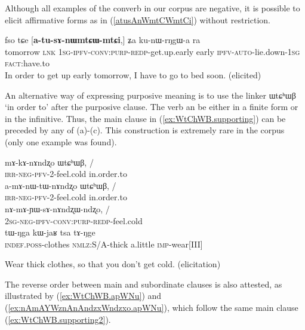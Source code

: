 \documentclass[oldfontcommands,oneside,a4paper,11pt]{article}
\newcommand{\ipa}[1]{{\phon \mbox{#1}}} %
\newcommand{\refb}[1]{(\ref{#1})}
\begin{document}
Although all examples of the converb in our corpus are negative, it is possible to elicit affirmative forms  as in \refb{atusAnWmtCWmtCi} without restriction.

\begin{exe}
\ex \label{atusAnWmtCWmtCi}
\gll
 \ipa{fso}   	\ipa{tɕe}   	[\ipa{\textbf{a-tu-sɤ-nɯmtɕɯ-mtɕi},}]   	\ipa{ʑa}   	\ipa{ku-nɯ-rŋgɯ-a}   	\ipa{ra}  \\
tomorrow \textsc{lnk} \textsc{1sg-ipfv-conv:purp-redp}-get.up.early early \textsc{ipfv-auto}-lie.down-\textsc{1sg} \textsc{fact}:have.to 
\\
\glt In order to get up early tomorrow, I have to go to bed soon. (elicited) 
\end{exe}

 An alternative way of expressing purposive meaning is to use the linker \ipa{ɯtɕʰɯβ} `in order to'  after the purposive clause. The verb  an be either in a finite form or in the infinitive.  Thus, the main clause in \refb{ex:WtChWB.supporting}  can be preceded by any of  (a)-(c).  This construction is extremely rare in the corpus (only one example was found).
 
 \begin{exe}
\ex \label{ex:WtChWB}  \begin{xlist}
\ex
 \gll 
\ipa{mɤ-kɤ-nɤndʐo} 	\ipa{ɯtɕʰɯβ,} 	/\\
 \textsc{irr-neg-pfv}-2-feel.cold in.order.to\\
 \ex
 \gll 
\ipa{a-mɤ-nɯ-tɯ-nɤndʐo} 	\ipa{ɯtɕʰɯβ,} / \\
 \textsc{irr-neg-pfv}-2-feel.cold in.order.to\\
 \ex \label{ex:nAmAsAnAndzxWndzxo}  
 \gll 
 \ipa{nɤ-mɤ-ɲɯ-sɤ-nɤndʐɯ-ndʐo,} /\\
 \textsc{2sg-neg-ipfv-conv:purp-redp}-feel.cold\\
 \ex  \label{ex:WtChWB.supporting}  
 \gll 
 \ipa{tɯ-ŋga}    	\ipa{kɯ-jaʁ}    	\ipa{tsa}    	\ipa{tɤ-ŋge}  \\
 \textsc{indef.poss}-clothes \textsc{nmlz}:S/A-thick a.little \textsc{imp}-wear[III] \\
  \end{xlist}
 \glt Wear thick clothes, so that you don't get cold. (elicitation)
  \end{exe}
 
The reverse order  between main and subordinate clauses is also attested,   as illustrated by \refb{ex:WtChWB.apWNu} and \refb{ex:nAmAYWznAnAndzxWndzxo.apWNu}, which follow the same   main clause \refb{ex:WtChWB.supporting2}.
\end{document}
